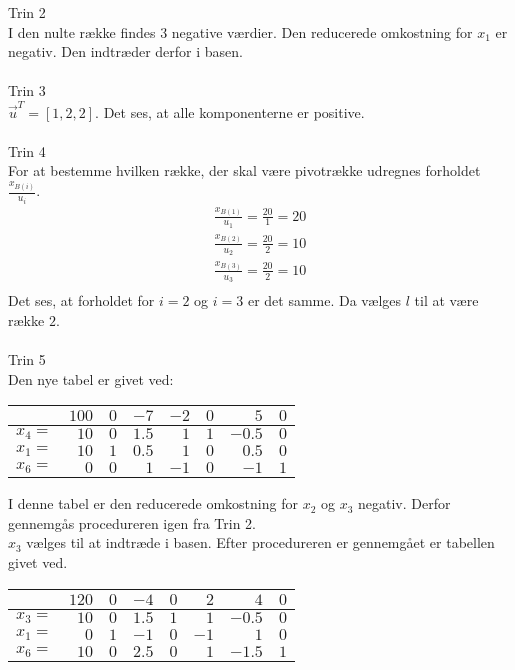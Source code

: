 \begin{eks}
Trin 2\\
I den nulte række findes $3$ negative værdier. Den reducerede omkostning for $x_1$ er negativ. Den indtræder derfor i basen. \\
\\
Trin 3\\
$\vec{u}^T=[1,2,2]$. Det ses, at alle komponenterne er positive. \\
\\
Trin 4\\
For at bestemme hvilken række, der skal være pivotrække udregnes forholdet $\frac{x_{B(i)}}{u_i}$. 
\begin{align*}
\frac{x_{B(1)}}{u_1}=\frac{20}{1}=20\\
\frac{x_{B(2)}}{u_2}=\frac{20}{2}=10\\
\frac{x_{B(3)}}{u_3}=\frac{20}{2}=10\\
\end{align*}
Det ses, at forholdet for $i=2$ og $i=3$ er det samme. Da vælges $l$ til at være række $2$. \\
\\
Trin 5\\
Den nye tabel er givet ved:
\begin{center}
\begin{tabular}{|r| r|r r r r r r|}
  \hline	
  &$100$&$0$ &$-7$&$-2$&$0$&$5$&$0$\\ \hline	
  $x_4=$&$10$&$0$&$1.5$&$1$&$1$&$-0.5$&$0$\\	
  $x_1=$&$10$&$1$&$0.5$&$1$&$0$&$0.5$&$0$\\
  $x_6=$&$0$&$0$&$1$&$-1$&$0$&$-1$&$1$\\
   \hline
\end{tabular}
\end{center}
I denne tabel er den reducerede omkostning for $x_2$ og $x_3$ negativ. Derfor gennemgås procedureren igen fra Trin 2.\\
$x_3$ vælges til at indtræde i basen. Efter procedureren er gennemgået er tabellen givet ved. 
\begin{center}
\begin{tabular}{|r| r|r r r r r r|}
  \hline	
  &$120$&$0$ &$-4$&$0$&$2$&$4$&$0$\\ \hline	
  $x_3=$&$10$&$0$&$1.5$&$1$&$1$&$-0.5$&$0$\\	
  $x_1=$&$0$&$1$&$-1$&$0$&$-1$&$1$&$0$\\
  $x_6=$&$10$&$0$&$2.5$&$0$&$1$&$-1.5$&$1$\\
   \hline
\end{tabular}

\end{center}
\end{eks}
